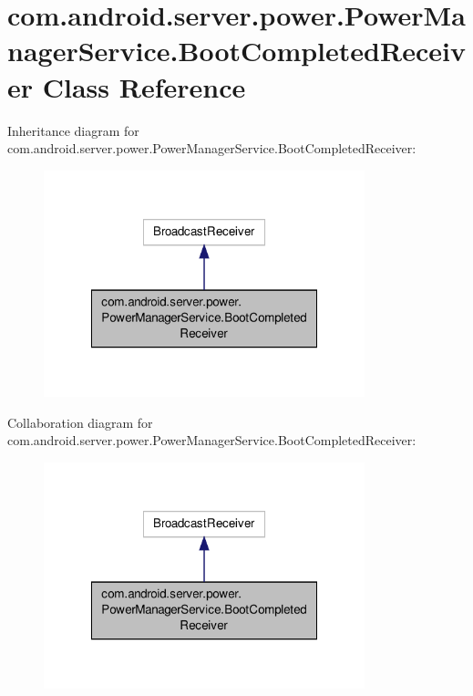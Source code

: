 \hypertarget{classcom_1_1android_1_1server_1_1power_1_1PowerManagerService_1_1BootCompletedReceiver}{\section{com.\-android.\-server.\-power.\-Power\-Manager\-Service.\-Boot\-Completed\-Receiver Class Reference}
\label{classcom_1_1android_1_1server_1_1power_1_1PowerManagerService_1_1BootCompletedReceiver}
}


Inheritance diagram for com.\-android.\-server.\-power.\-Power\-Manager\-Service.\-Boot\-Completed\-Receiver\-:
\nopagebreak
\begin{figure}[H]
\begin{center}
\leavevmode
\includegraphics[width=264pt]{classcom_1_1android_1_1server_1_1power_1_1PowerManagerService_1_1BootCompletedReceiver__inherit__graph}
\end{center}
\end{figure}


Collaboration diagram for com.\-android.\-server.\-power.\-Power\-Manager\-Service.\-Boot\-Completed\-Receiver\-:
\nopagebreak
\begin{figure}[H]
\begin{center}
\leavevmode
\includegraphics[width=264pt]{classcom_1_1android_1_1server_1_1power_1_1PowerManagerService_1_1BootCompletedReceiver__coll__graph}
\end{center}
\end{figure}
